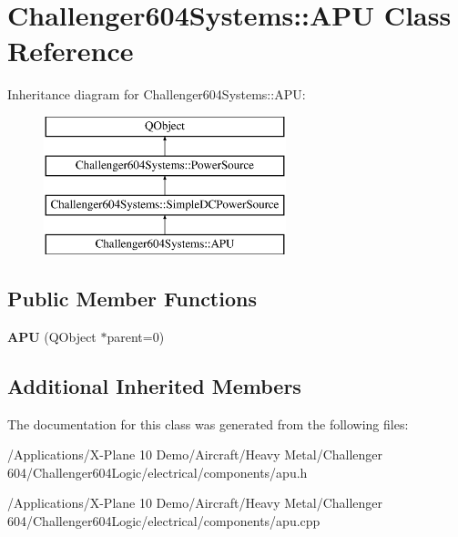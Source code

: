 \hypertarget{class_challenger604_systems_1_1_a_p_u}{\section{Challenger604\-Systems\-:\-:A\-P\-U Class Reference}
\label{class_challenger604_systems_1_1_a_p_u}
}
Inheritance diagram for Challenger604\-Systems\-:\-:A\-P\-U\-:\begin{figure}[H]
\begin{center}
\leavevmode
\includegraphics[height=4.000000cm]{class_challenger604_systems_1_1_a_p_u}
\end{center}
\end{figure}
\subsection*{Public Member Functions}
\begin{DoxyCompactItemize}
\item 
\hypertarget{class_challenger604_systems_1_1_a_p_u_aaa90feec507ea4f9b5eff275d2f040da}{{\bfseries A\-P\-U} (Q\-Object $\ast$parent=0)}\label{class_challenger604_systems_1_1_a_p_u_aaa90feec507ea4f9b5eff275d2f040da}

\end{DoxyCompactItemize}
\subsection*{Additional Inherited Members}


The documentation for this class was generated from the following files\-:\begin{DoxyCompactItemize}
\item 
/\-Applications/\-X-\/\-Plane 10 Demo/\-Aircraft/\-Heavy Metal/\-Challenger 604/\-Challenger604\-Logic/electrical/components/apu.\-h\item 
/\-Applications/\-X-\/\-Plane 10 Demo/\-Aircraft/\-Heavy Metal/\-Challenger 604/\-Challenger604\-Logic/electrical/components/apu.\-cpp\end{DoxyCompactItemize}
